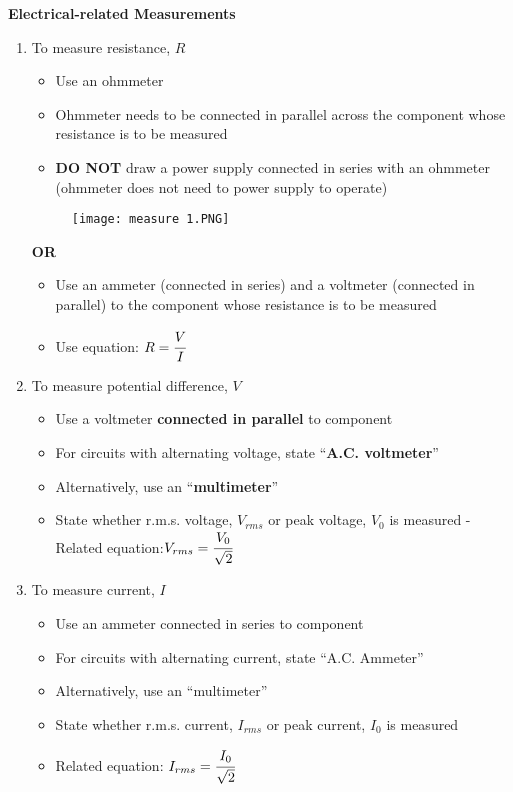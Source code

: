 \documentclass{article}
\begin{document}
\begin{flushleft}
\textbf{Electrical-related Measurements}
\end{flushleft}
\begin{enumerate}
    \item To measure resistance, $R$
    \begin{itemize}
        \item Use an ohmmeter
\item	Ohmmeter needs to be connected in parallel across the component whose resistance is to be measured
\item	\textbf{DO NOT} draw a power supply connected in series with an ohmmeter (ohmmeter does not need to power supply to operate)
    \end{itemize}
    \begin{figure}[H]
        \centering
        \texttt{[image: measure 1.PNG]}
    \end{figure}
    \textbf{OR}
    \begin{itemize}
        \item Use an ammeter (connected in series) and a voltmeter (connected in parallel) to the component whose resistance is to be measured
\item	Use equation: $R=\cfrac{V}{I}$
    \end{itemize}
    
    \item To measure potential difference, $V$
    \begin{itemize}
        \item Use a voltmeter\textbf{ connected in parallel} to component
\item	For circuits with alternating voltage, state “\textbf{A.C. voltmeter}”
\item	Alternatively, use an “\textbf{multimeter}”
\item	State whether r.m.s. voltage, $V_{rms}$ or peak voltage, $V_0$ is measured
-	Related equation:$V_{rms}=\cfrac{V_0}{\sqrt{2}}$
    \end{itemize}
 
 \item To measure current, $I$   
    \begin{itemize}
        \item Use an ammeter connected in series to component
        \item For circuits with alternating current, state “A.C. Ammeter”
\item	Alternatively, use an “multimeter”
\item	State whether r.m.s. current, $I_{rms}$ or peak current, $I_0$ is measured
\item Related equation: $I_{rms}=\cfrac{I_0}{\sqrt{2}}$


\end{itemize}
\end{enumerate}
\end{document}
